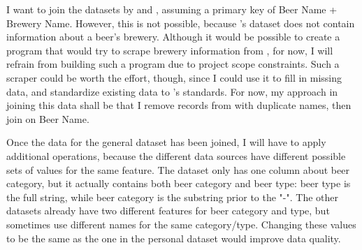 \documentclass[sigconf, natbib=true]{acmart}
\begin{document}
I want to join the datasets by \citet{openbeerdb} and \citet{philipperemy}, assuming a primary key of Beer Name + Brewery Name.
However, this is not possible, because \citeauthor{philipperemy}'s dataset does not contain information about a beer's brewery.
Although it would be possible to create a program that would try to scrape brewery information from \citeauthor{untappd}, for now, I will refrain from building such a program due to project scope constraints.
Such a scraper could be worth the effort, though, since I could use it to fill in missing data, and standardize existing data to \citeauthor{untappd}'s standards.
For now, my approach in joining this data shall be that I remove records from \citeauthor{philipperemy} with duplicate names, then join on Beer Name.

Once the data for the general dataset has been joined, I will have to apply additional operations, because the different data sources have different possible sets of values for the same feature.
The \citeauthor{untappd} dataset only has one column about beer category, but it actually contains both beer category and beer type: beer type is the full string, while beer category is the substring prior to the "-".
The other datasets already have two different features for beer category and type, but sometimes use different names for the same category/type.
Changing these values to be the same as the one in the personal dataset would improve data quality.


\def\bibfont{\small} %
 
\end{document}
